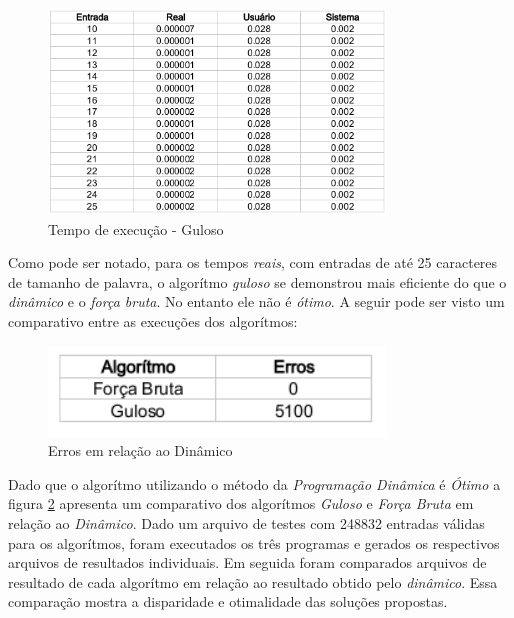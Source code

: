 \begin{figure}[H]
    \begin{center}
        \includegraphics[width=0.8\textwidth,natwidth=610,natheight=642]{doc/greedy-time-test.png}
        \caption{Tempo de execução - Guloso}
        \label{fig:greedytime}
    \end{center}
\end{figure}

Como pode ser notado, para os tempos {\it reais}, com entradas de até 25 
caracteres de tamanho de palavra, o algorítmo \emph{guloso} se demonstrou
mais eficiente do que o \emph{dinâmico} e o \emph{força bruta}. No entanto
ele não é \emph{ótimo}. A seguir pode ser visto um comparativo entre as 
execuções dos algorítmos: 

\begin{figure}[H]
    \begin{center}
        \includegraphics[width=0.8\textwidth,natwidth=610,natheight=642]{doc/errors.png}
        \caption{Erros em relação ao Dinâmico}
        \label{fig:errors}
    \end{center}
\end{figure}

Dado que o algorítmo utilizando o método da \emph{Programação Dinâmica}
é \emph{Ótimo} a figura \ref{fig:errors} apresenta um comparativo dos 
algorítmos \emph{Guloso} e \emph{Força Bruta} em relação ao 
\emph{Dinâmico}. Dado um arquivo de testes com 248832 entradas válidas 
para os algorítmos, foram executados os três programas e gerados os 
respectivos arquivos de resultados individuais. Em seguida foram 
comparados arquivos de resultado de cada algorítmo em relação ao 
resultado obtido pelo \emph{dinâmico}. Essa comparação mostra a 
disparidade e otimalidade das soluções propostas.


